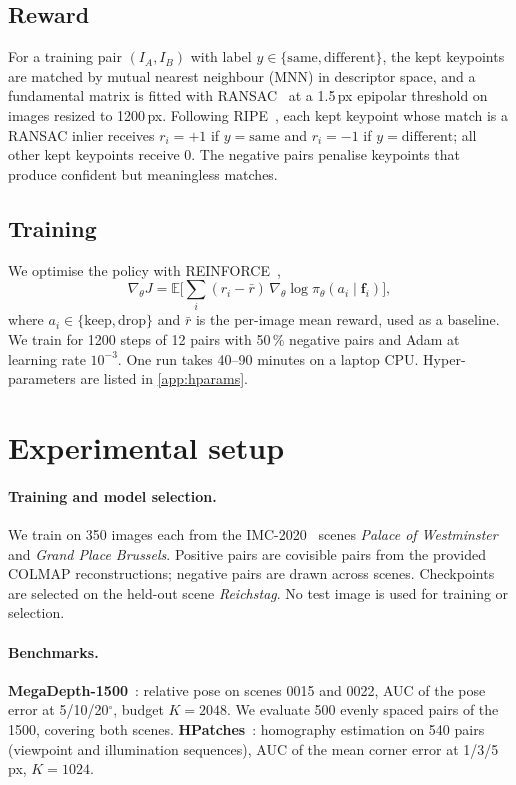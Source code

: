 \documentclass[10pt,twocolumn,letterpaper]{article}
\begin{document}
\subsection{Reward}
For a training pair $(I_A, I_B)$ with label $y\in\{\text{same},\text{different}\}$, the kept keypoints
are matched by mutual nearest neighbour (MNN) in descriptor space, and a fundamental matrix is fitted
with RANSAC~\cite{larsson2020poselib} at a 1.5\,px epipolar threshold on images resized to 1200\,px.
Following RIPE~\cite{kunzel2025ripe}, each kept keypoint whose match is a RANSAC inlier receives
$r_i=+1$ if $y=\text{same}$ and $r_i=-1$ if $y=\text{different}$; all other kept keypoints receive 0.
The negative pairs penalise keypoints that produce confident but meaningless matches.

\subsection{Training}
We optimise the policy with REINFORCE~\cite{williams1992reinforce},
\begin{equation}
  \nabla_\theta J = \mathbb{E}\Big[\textstyle\sum_i (r_i - \bar r)\,\nabla_\theta \log
  \pi_\theta(a_i \mid \mathbf{f}_i)\Big],
\end{equation}
where $a_i\in\{\text{keep},\text{drop}\}$ and $\bar r$ is the per-image mean reward, used as a
baseline. We train for 1200 steps of 12 pairs with 50\,\% negative pairs and Adam at learning rate
$10^{-3}$. One run takes 40--90 minutes on a laptop CPU. Hyper-parameters are listed in
\cref{app:hparams}.

\section{Experimental setup}
\label{sec:setup}

\paragraph{Training and model selection.}
We train on 350 images each from the IMC-2020~\cite{jin2021imc} scenes \emph{Palace of Westminster}
and \emph{Grand Place Brussels}. Positive pairs are covisible pairs from the provided COLMAP
reconstructions; negative pairs are drawn across scenes. Checkpoints are selected on the held-out scene
\emph{Reichstag}. No test image is used for training or selection.

\paragraph{Benchmarks.}
\textbf{MegaDepth-1500}~\cite{li2018megadepth,sun2021loftr}: relative pose on scenes 0015 and 0022, AUC
of the pose error at 5/10/20$^\circ$, budget $K=2048$. We evaluate 500 evenly spaced pairs of the 1500,
covering both scenes. \textbf{HPatches}~\cite{balntas2017hpatches}: homography estimation on 540 pairs
(viewpoint and illumination sequences), AUC of the mean corner error at 1/3/5\,px, $K=1024$.
\end{document}
